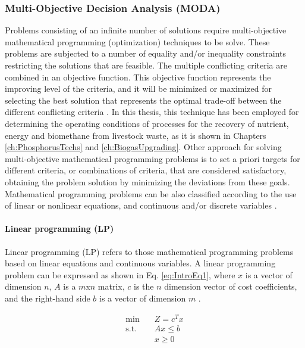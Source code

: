 \begin{refsection}[referencesCh1]
\subsubsection{Multi-Objective Decision Analysis (MODA)}

Problems consisting of an infinite number of solutions require multi-objective mathematical programming (optimization) techniques to be solve. These problems are subjected to a number of equality and/or inequality constraints restricting the solutions that are feasible.
The multiple conflicting criteria are combined in an objective function. This objective function represents the improving level of the criteria, and it will be minimized or maximized for selecting the best solution that represents the optimal trade-off between the different conflicting criteria \citep{giove2009decision}. In this thesis, this technique has been employed for determining the operating conditions of processes for the recovery of nutrient, energy and biomethane from livestock waste, as it is shown in Chapters \ref{ch:PhosphorusTechs} and \ref{ch:BiogasUpgrading}. Other approach for solving multi-objective mathematical programming problems is to set a priori targets for different criteria, or combinations of criteria, that are considered satisfactory, obtaining the problem solution by minimizing the deviations from these goals. Mathematical programming problems can be also classified according to the use of linear or nonlinear equations, and continuous and/or discrete variables \citep{giove2009decision}.

\paragraph{Linear programming (LP)}
Linear programming (LP) refers to those mathematical programming problems based on linear equations and continuous variables. A linear programming problem can be expressed as shown in Eq. \ref{eq:IntroEq1},  where $x$ is a vector of dimension $n$, $A$ is a $m$x$n$ matrix, $c$ is the $n$ dimension vector of cost coefficients, and the right-hand side $b$ is a vector of dimension $m$ \citep{grossmann2021advanced}.

\begin{align}
	\min \quad & Z=c^{T}x \nonumber\\
	\textrm{s.t.} \quad & Ax \leq b \label{eq:IntroEq1}\\
	&x \geq 0  \nonumber  
\end{align}


\end{refsection}
